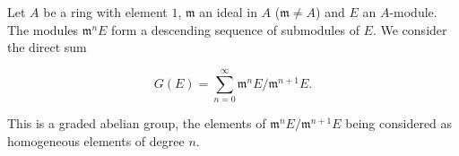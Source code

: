 Let $A$ be a ring with element $1$, $\mathfrak{m}$ an ideal in $A$ ($\mathfrak{m} \neq A$) and $E$ an $A$-module. The modules $\mathfrak{m}^n E$ form a descending sequence of submodules of $E$. We consider the direct sum

$$G(E) = \sum_{n=0}^{\infty} \mathfrak{m}^n E / \mathfrak{m}^{n+1} E.$$

This is a graded abelian group, the elements of $\mathfrak{m}^n E / \mathfrak{m}^{n+1} E$ being considered as homogeneous elements of degree $n$.